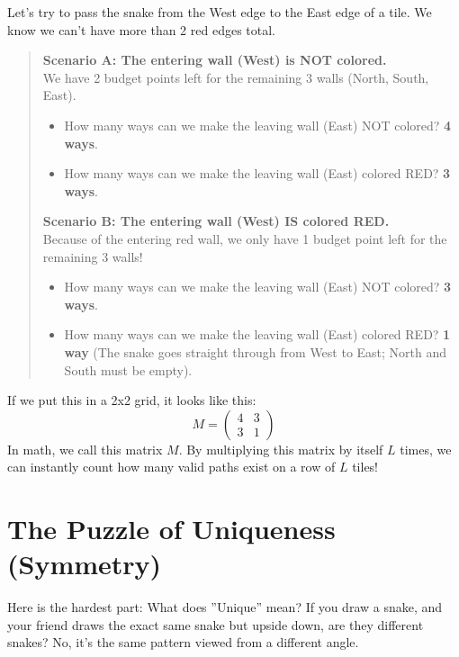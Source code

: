 \documentclass[12pt]{article}
\begin{document}
Let's try to pass the snake from the West edge to the East edge of a tile. We know we can't have more than 2 red edges total.
\vspace{0.3cm}

\begin{quote}
\textbf{Scenario A: The entering wall (West) is NOT colored.} \\
We have 2 budget points left for the remaining 3 walls (North, South, East).
\begin{itemize}
    \item How many ways can we make the leaving wall (East) NOT colored? \textbf{4 ways}.
    \item How many ways can we make the leaving wall (East) colored RED? \textbf{3 ways}.
\end{itemize}

\textbf{Scenario B: The entering wall (West) IS colored RED.} \\
Because of the entering red wall, we only have 1 budget point left for the remaining 3 walls!
\begin{itemize}
    \item How many ways can we make the leaving wall (East) NOT colored? \textbf{3 ways}.
    \item How many ways can we make the leaving wall (East) colored RED? \textbf{1 way} (The snake goes straight through from West to East; North and South must be empty).
\end{itemize}
\end{quote}

If we put this in a 2x2 grid, it looks like this:
\begin{equation}
M = \begin{pmatrix} 4 & 3 \\ 3 & 1 \end{pmatrix}
\end{equation}
In math, we call this matrix $M$. By multiplying this matrix by itself $L$ times, we can instantly count how many valid paths exist on a row of $L$ tiles!

\section{The Puzzle of Uniqueness (Symmetry)}
Here is the hardest part: What does ''Unique'' mean? 
If you draw a snake, and your friend draws the exact same snake but upside down, are they different snakes? No, it's the same pattern viewed from a different angle.
\end{document}
